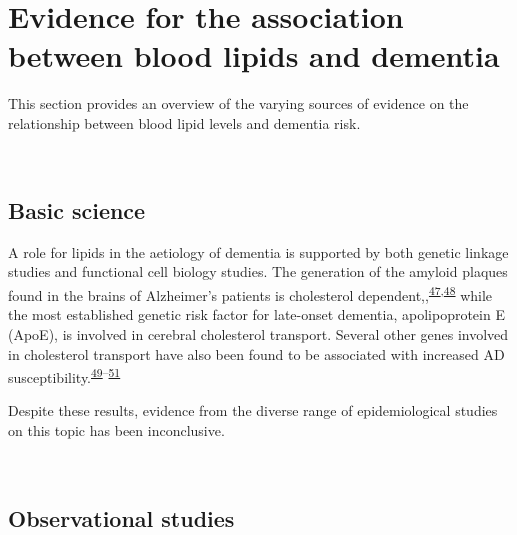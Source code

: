 \documentclass[a4paper, twoside]{templates/ociamthesis}
\begin{document}
~

\hypertarget{evidence-association}{%
\section{Evidence for the association between blood lipids and dementia}\label{evidence-association}}

This section provides an overview of the varying sources of evidence on the relationship between blood lipid levels and dementia risk.

~

\hypertarget{intro-basic-science}{%
\subsection{Basic science}\label{intro-basic-science}}

A role for lipids in the aetiology of dementia is supported by both genetic linkage studies and functional cell biology studies. The generation of the amyloid plaques found in the brains of Alzheimer's patients is cholesterol dependent,,\textsuperscript{\protect\hyperlink{ref-burns2003}{47},\protect\hyperlink{ref-mizuno1999}{48}} while the most established genetic risk factor for late-onset dementia, apolipoprotein E (ApoE), is involved in cerebral cholesterol transport. Several other genes involved in cholesterol transport have also been found to be associated with increased AD susceptibility.\textsuperscript{\protect\hyperlink{ref-beecham2014}{49}--\protect\hyperlink{ref-meng2007}{51}}

Despite these results, evidence from the diverse range of epidemiological studies on this topic has been inconclusive.

~

\hypertarget{observational-studies}{%
\subsection{Observational studies}\label{observational-studies}}
\end{document}
